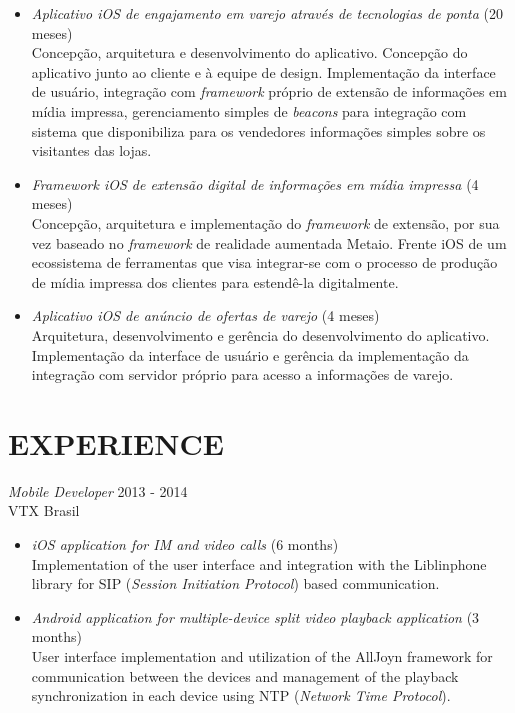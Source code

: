 \documentclass[]{res} %
\newcommand{\sbt}{\,\begin{picture}(-1,1)(-2,-3)\circle*{2}\end{picture}\ }
\def \divspace{6pt}
\def \myitemback{0.55cm}
\def \myitemsep{0pt}
\def \mypositionface{\sl}
\def \myorgface{\sc}
\newif\ifgames
\begin{document}
\begin{resume}
\begin{itemize}[itemsep=\myitemsep,leftmargin=\myitemback]
    \ifgames
        \vfill
    \else
    \fi

    \item[\sbt] {\it Aplicativo iOS de engajamento em varejo através de tecnologias de ponta} \hfill (20 meses)\\
    Concepção, arquitetura e desenvolvimento do aplicativo. Concepção do aplicativo junto ao cliente e à equipe de design. Implementação da interface de usuário, integração com {\it framework} próprio de extensão de informações em mídia impressa, gerenciamento simples de {\it beacons} para integração com sistema que disponibiliza para os vendedores informações simples sobre os visitantes das lojas.
    \item[\sbt] {\it Framework iOS de extensão digital de informações em mídia impressa} \hfill (4 meses)\\
    Concepção, arquitetura e implementação do {\it framework} de extensão, por sua vez baseado no {\it framework} de realidade aumentada Metaio. Frente iOS de um ecossistema de ferramentas que visa integrar-se com o processo de produção de mídia impressa dos clientes para estendê-la digitalmente.

    \ifgames
    \else
        \vfill
    \fi

    \item[\sbt] {\it Aplicativo iOS de anúncio de ofertas de varejo} \hfill (4 meses)\\
    Arquitetura, desenvolvimento e gerência do desenvolvimento do aplicativo. Implementação da interface de usuário e gerência da implementação da integração com servidor próprio para acesso a informações de varejo.
\end{itemize}
\else
    \section{EXPERIENCE \hspace{\divspace} }

    {\mypositionface Mobile Developer} \hfill 2013 - 2014 \\
    {\myorgface VTX Brasil}

    \begin{itemize}[itemsep=\myitemsep,leftmargin=\myitemback]
    \item[\sbt] {\it iOS application for IM and video calls} \hfill (6 months)\\
    Implementation of the user interface and integration with the Liblinphone library for SIP ({\it Session Initiation Protocol}) based communication.
    \item[\sbt] {\it Android application for multiple-device split video playback application} \hfill (3 months)\\
    User interface implementation and utilization of the AllJoyn framework for communication between the devices and management of the playback synchronization in each device using NTP ({\it Network Time Protocol}).
    \end{itemize}


\end{resume}
\end{document}
